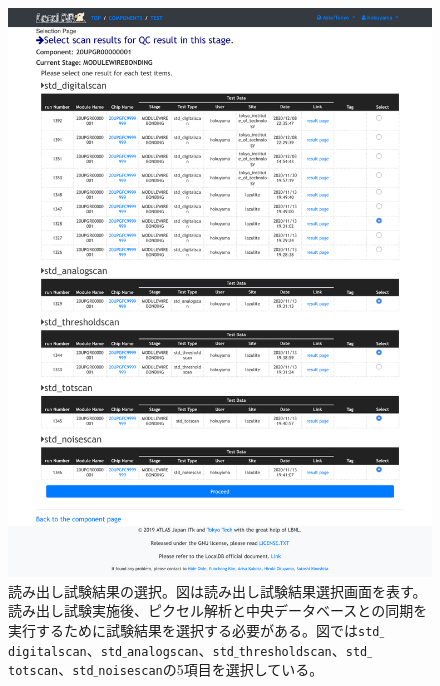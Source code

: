 \begin{figure}[bpt]\centering
  \begin{center}
    \includegraphics[width=15cm]{./demo_select_scans.pdf}
  \caption[読み出し試験結果の選択]{読み出し試験結果の選択。図は読み出し試験結果選択画面を表す。読み出し試験実施後、ピクセル解析と中央データベースとの同期を実行するために試験結果を選択する必要がある。図では\texttt{std$\_$digitalscan}、\texttt{std$\_$analogscan}、\texttt{std$\_$thresholdscan}、\texttt{std$\_$totscan}、\texttt{std$\_$noisescan}の5項目を選択している。}
  \label{demo_select_scans}
  \end{center}
\end{figure}

